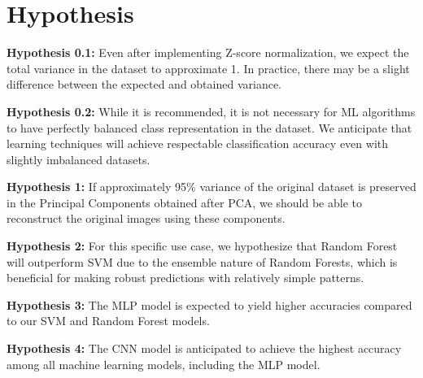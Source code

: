 \section{Hypothesis}

\textbf{Hypothesis 0.1:} Even after implementing Z-score normalization, we expect the total variance in the dataset to approximate 1. In practice, there may be a slight difference between the expected and obtained variance.

\textbf{Hypothesis 0.2:} While it is recommended, it is not necessary for ML algorithms to have perfectly balanced class representation in the dataset. We anticipate that learning techniques will achieve respectable classification accuracy even with slightly imbalanced datasets.

\textbf{Hypothesis 1:} If approximately 95\% variance of the original dataset is preserved in the Principal Components obtained after PCA, we should be able to reconstruct the original images using these components.

\textbf{Hypothesis 2:} For this specific use case, we hypothesize that Random Forest will outperform SVM due to the ensemble nature of Random Forests, which is beneficial for making robust predictions with relatively simple patterns.

\textbf{Hypothesis 3:} The MLP model is expected to yield higher accuracies compared to our SVM and Random Forest models.

\textbf{Hypothesis 4:} The CNN model is anticipated to achieve the highest accuracy among all machine learning models, including the MLP model.

